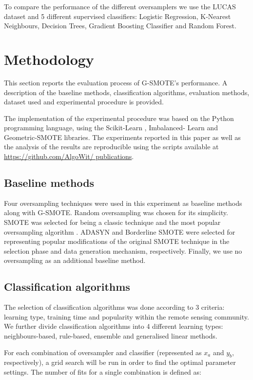 \documentclass[parskip=full]{scrartcl}
\begin{document}
To compare the performance of the different oversamplers we use the LUCAS
dataset and 5 different supervised classifiers: Logistic Regression, K-Nearest
Neighbours, Decision Trees, Gradient Boosting Classifier and Random Forest.

\section{Methodology}

This section reports the evaluation process of G-SMOTE's performance. A
description of the baseline methods, classification algorithms, evaluation
methods, dataset used and experimental procedure is provided.

The implementation of the experimental procedure was based on the Python
programming language, using the Scikit-Learn \cite{Pedregosa2011}, Imbalanced-
Learn \cite{JMLR:v18:16-365} and Geometric-SMOTE \cite{Douzas2019} libraries.
The experiments reported in this paper as well as the analysis of the results
are reproducible using the scripts available at \url{https://github.com/AlgoWit/
publications}.

\subsection{Baseline methods}

Four oversampling techniques were used in this experiment as baseline methods
along with G-SMOTE. Random oversampling was chosen for its simplicity.
SMOTE was selected for being a classic technique and the most popular
oversampling algorithm \cite{Douzas2019}. ADASYN \cite{HaiboHe2008} and
Borderline SMOTE \cite{Han2005} were selected for representing popular
modifications of the original SMOTE technique in the selection phase and data
generation mechanism, respectively. Finally, we use no oversampling as an
additional baseline method.

\subsection{Classification algorithms}

The selection of classification algorithms was done according to 3 criteria:
learning type, training time and popularity within the remote sensing
community. We further divide classification algorithms into 4 different learning
types: neighbours-based, rule-based, ensemble and generalised linear methods.

For each combination of oversampler and classifier (represented as $x_a$ and
$y_b$, respectively), a grid search will be run in order to find the optimal
parameter settings. The number of fits for a single combination  is defined as:
\end{document}
